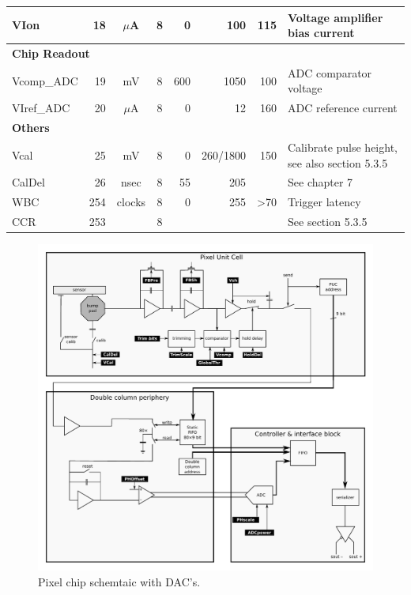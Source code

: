 \begin{table}[h]
\begin{center}
{\begin{tabular}{lrccrrrl}
	VIon        & 18 & $\mu$A  & 8 & 0 & 100 & 115 & Voltage amplifier bias current \\ 
	\midrule
	\multicolumn{ 8}{l}{\textbf{Chip Readout}} \\ 
	Vcomp\_ADC  & 19 & mV & 8  & 600 & 1050 & 100 & ADC comparator voltage \\ 
	VIref\_ADC  & 20 & $\mu$A  & 8 & 0 & 12 & 160 & ADC reference current \\ 
	\midrule
	\multicolumn{ 8}{l}{\textbf{Others}} \\ 
	Vcal        & 25 & mV      & 8 & 0 & 260/1800 & 150 & Calibrate pulse height, see also section 5.3.5 \\ 
	CalDel      & 26 & nsec    & 8 & 55 & 205 &  & See chapter 7 \\ 
	WBC         & 254 & clocks & 8 & 0 & 255 &                 >70 & Trigger latency \\ 
	CCR         & 253 &        & 8 &  &  &  & See section 5.3.5 \\ 
	\bottomrule
	\end{tabular}
	}
    \end{center}
\end{table}

\begin{figure}[hbtp]
	\begin{center}
	\includegraphics[width=.9\textwidth]{img/ROC_DACschema.pdf}
	\end{center}
	\caption{Pixel chip schemtaic with DAC's. }
	\label{fig:ROCDACschematic}
\end{figure}



